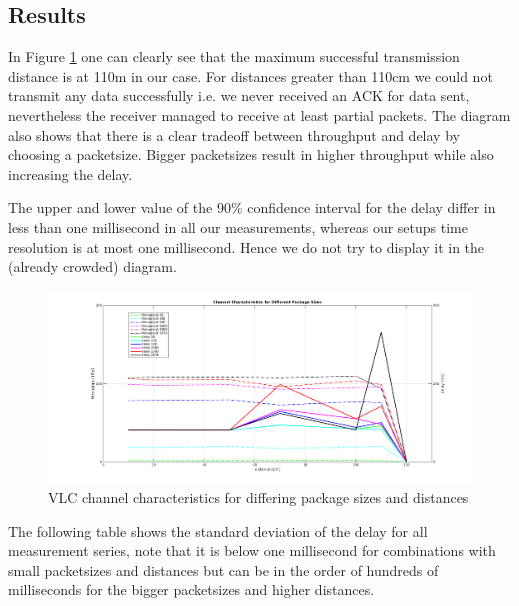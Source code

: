 \subsection{Results}
In Figure \ref{fig:chanchar} one can clearly see that the maximum successful transmission distance is at 110m in our case. For distances greater than 110cm we could not transmit any data successfully i.e. we never received an ACK for data sent, nevertheless the receiver managed to receive at least partial packets.
The diagram also shows that there is a clear tradeoff between throughput and delay by choosing a packetsize. Bigger packetsizes result in higher throughput while also increasing the delay.

The upper and lower value of the 90\% confidence interval for the delay differ in less than one millisecond in all our measurements, whereas our setups time resolution is at most one millisecond. Hence we do not try to display it in the (already crowded) diagram.




\begin{figure}[htp]
\centering
\includegraphics[width=\textwidth]{../img/plot_channel-characteristics.png}
\caption{VLC channel characteristics for differing package sizes and distances}
\label{fig:chanchar}
\end{figure}

The following table shows the standard deviation of the delay for all measurement series, note  that it is below one millisecond for combinations with small packetsizes and distances but can be in the order of hundreds of milliseconds for the bigger packetsizes and higher distances.

